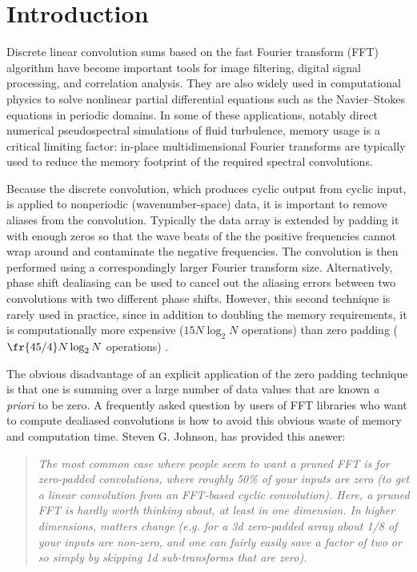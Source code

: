 \documentclass[final]{siamltex}
\begin{document}
%


\section{Introduction}
Discrete linear convolution sums based on the fast Fourier transform (FFT)
algorithm have become important tools for image filtering, digital signal
processing, and correlation analysis. They are also widely used in
computational physics to solve nonlinear partial differential equations
such as the Navier--Stokes equations in periodic domains. In some of these
applications, notably direct numerical pseudospectral simulations of fluid
turbulence, memory usage is a critical limiting factor: in-place
multidimensional Fourier transforms are typically used to reduce the memory
footprint of the required spectral convolutions.

Because the discrete convolution, which produces cyclic output from cyclic
input, is applied to nonperiodic (wavenumber-space) data, it is important
to remove aliases from the convolution. Typically the data array is
extended by padding it with enough zeros so that the wave beats of the
the positive frequencies cannot wrap around and contaminate
the negative frequencies. The convolution is then performed using a
correspondingly larger Fourier transform size. Alternatively, phase
shift dealiasing \cite{Patterson71,Canuto} can be used to cancel out the
aliasing errors between two convolutions with two different phase
shifts. However, this second technique is rarely used in practice, since in
addition to doubling the memory requirements, it is computationally more
expensive ($15N\log_2 N$ operations) than zero padding
($\fr{45/4}N\log_2 N$ operations) \cite[p.~136]{Canuto}. 


The obvious disadvantage of an explicit application of the zero padding
technique is that one is summing over a large number of data values that
are known {\it a priori\/} to be zero.
A frequently asked question by users of FFT libraries
who want to compute dealiased convolutions is how to avoid this obvious
waste of memory and computation time.
Steven G. Johnson, has provided this
answer\cite{http://www.fftw.org/pruned.html}:
\begin{quotation}
{\it
The most common case where people seem to want a pruned FFT is for
zero-padded convolutions, where roughly 50\% of your inputs are zero (to
get a linear convolution from an FFT-based cyclic convolution). Here, a
pruned FFT is hardly worth thinking about, at least in one dimension. In
higher dimensions, matters change (e.g. for a 3d zero-padded array about
1/8 of your inputs are non-zero, and one can fairly easily save a factor of
two or so simply by skipping 1d sub-transforms that are zero).
}
\end{quotation}
\end{document}
